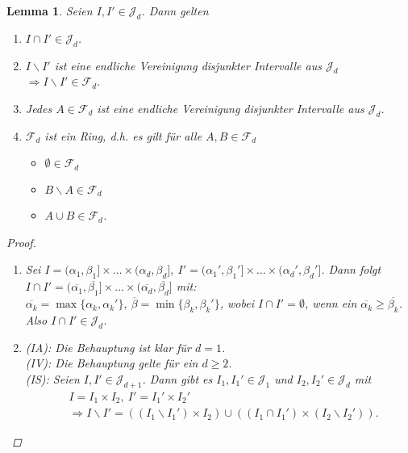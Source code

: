 \documentclass[a4paper]{scrreprt}
\newcommand{\Fd}{\mathcal{F}_d}
\newcommand{\Jd}{\mathcal{J}_d}
\newcommand{\jlabel}[1]{\label{j_#1}}
\theoremstyle{plain}
\newtheorem{lem}[thm]{Lemma}
\theoremstyle{definition}
\begin{document}
{{{\begin{lem}
\jlabel{Lem 1.15}
    Seien $I, I' \in \Jd$. Dann gelten
    \begin{enumerate}
        \item $I \cap I' \in \Jd$.
        \item $I\backslash I'$ ist eine endliche Vereinigung disjunkter Intervalle aus $\Jd$ $\Rightarrow I \backslash I' \in \Fd$.
        \item Jedes $A\in \Fd$ ist eine endliche Vereinigung disjunkter Intervalle aus $\Jd$.
        \item 
            $\Fd$ ist ein Ring, d.h. es gilt für alle $A,B\in \Fd$
            \begin{itemize}
                \item[(R1)] $\emptyset \in \Fd$
                \item[(R2)] $B\backslash A \in \Fd$
                \item[(R3)] $A \cup B \in \Fd$.
            \end{itemize}
    \end{enumerate}
    \begin{proof}
        \begin{enumerate}
            \item 
                Sei $I = (\alpha_1, \beta_1] \times \dots \times (\alpha_d, \beta_d], \ I' = (\alpha_1', \beta_1'] \times \dots \times (\alpha_d', \beta_d']$. Dann folgt $I \cap I' = (\overline{\alpha_1}, \overline{\beta_1}] \times \dots \times (\overline{\alpha_d}, \overline{\beta_d}]$ mit:\\
                $\overline{\alpha_k} = \max\{\alpha_k, \alpha_k'\}, \ \overline{\beta} = \min\{\beta_k, \beta_k'\}$, wobei $I\cap I' = \emptyset$, wenn ein $\overline{\alpha_k} \ge \overline{\beta_k}$. Also $I \cap I' \in \Jd$.
            \item
                (IA): Die Behauptung ist klar für $d=1$.\\
                (IV): Die Behauptung gelte für ein $d \ge 2$.\\
                (IS): Seien $I,I' \in \mathcal{J}_{d+1}$. Dann gibt es $I_1, I_1' \in \mathcal{J}_1$ und $I_2, I_2' \in \Jd$ mit
                \begin{displaymath}
                    \begin{split}
                        &I = I_1 \times I_2, \ I' = I_1' \times I_2'\\
                        &\Rightarrow I\backslash I' = ((I_1\backslash I_1')\times I_2)\cup((I_1 \cap I_1')\times(I_2\backslash I_2')).

\end{split}
\end{displaymath}
\end{enumerate}
\end{proof}
\end{lem}}}}
\end{document}
